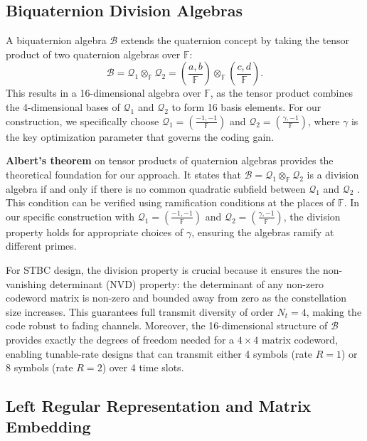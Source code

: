 \subsection{Biquaternion Division Algebras}

A biquaternion algebra $\mathcal{B}$ extends the quaternion concept by taking the tensor product of two quaternion algebras over $\mathbb{F}$:
\begin{equation}
\mathcal{B} = \mathcal{Q}_1 \otimes_{\mathbb{F}} \mathcal{Q}_2 = \left(\frac{a, b}{\mathbb{F}}\right) \otimes_{\mathbb{F}} \left(\frac{c, d}{\mathbb{F}}\right).
\end{equation}
This results in a 16-dimensional algebra over $\mathbb{F}$, as the tensor product combines the 4-dimensional bases of $\mathcal{Q}_1$ and $\mathcal{Q}_2$ to form 16 basis elements. For our construction, we specifically choose $\mathcal{Q}_1 = \left(\frac{-1, -1}{\mathbb{F}}\right)$ and $\mathcal{Q}_2 = \left(\frac{\gamma, -1}{\mathbb{F}}\right)$, where $\gamma$ is the key optimization parameter that governs the coding gain.

\textbf{Albert's theorem} on tensor products of quaternion algebras provides the theoretical foundation for our approach. It states that $\mathcal{B} = \mathcal{Q}_1 \otimes_{\mathbb{F}} \mathcal{Q}_2$ is a division algebra if and only if there is no common quadratic subfield between $\mathcal{Q}_1$ and $\mathcal{Q}_2$ \cite{3}. This condition can be verified using ramification conditions at the places of $\mathbb{F}$. In our specific construction with $\mathcal{Q}_1 = \left(\frac{-1, -1}{\mathbb{F}}\right)$ and $\mathcal{Q}_2 = \left(\frac{\gamma, -1}{\mathbb{F}}\right)$, the division property holds for appropriate choices of $\gamma$, ensuring the algebras ramify at different primes.

For STBC design, the division property is crucial because it ensures the non-vanishing determinant (NVD) property: the determinant of any non-zero codeword matrix is non-zero and bounded away from zero as the constellation size increases. This guarantees full transmit diversity of order $N_t = 4$, making the code robust to fading channels. Moreover, the 16-dimensional structure of $\mathcal{B}$ provides exactly the degrees of freedom needed for a $4 \times 4$ matrix codeword, enabling tunable-rate designs that can transmit either 4 symbols (rate $R=1$) or 8 symbols (rate $R=2$) over 4 time slots.

\subsection{Left Regular Representation and Matrix Embedding}

